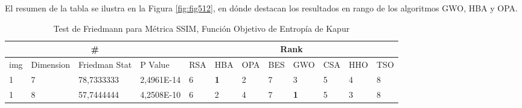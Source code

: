 \documentclass[conference]{IEEEtran}
\begin{document}
\noindent El resumen de la tabla se ilustra en la Figura \ref{fig:fig512}, en dónde destacan los resultados en rango de los algoritmos GWO, HBA y OPA.
\begin{table*}[]
	\centering
	\caption{Test de Friedmann para Métrica SSIM, Función Objetivo de Entropía de Kapur}
	\begin{tabular}{|llll|llllllll|}
		\hline
		\multicolumn{4}{|c|}{\#} & \multicolumn{8}{c|}{Rank} \\ \hline
		\multicolumn{1}{|l|}{img} & \multicolumn{1}{l|}{Dimension} & \multicolumn{1}{l|}{Friedman Stat} & P Value & \multicolumn{1}{l|}{RSA} & \multicolumn{1}{l|}{HBA} & \multicolumn{1}{l|}{OPA} & \multicolumn{1}{l|}{BES} & \multicolumn{1}{l|}{GWO} & \multicolumn{1}{l|}{CSA} & \multicolumn{1}{l|}{HHO} & TSO \\ \hline                                                                                                                                                                       
\multicolumn{1}{|l|}{1}                                                     & \multicolumn{1}{l|}{7}                                                        & \multicolumn{1}{l|}{78,7333333}                                                   & 2,4961E-14                     & \multicolumn{1}{l|}{6}                                                  & \multicolumn{1}{l|}{\textbf{1}}                                         & \multicolumn{1}{l|}{2}                                                  & \multicolumn{1}{l|}{7}                                                  & \multicolumn{1}{l|}{3}                                                  & \multicolumn{1}{l|}{5}                                                  & \multicolumn{1}{l|}{4}                                                  & 8                          \\ \hline
\multicolumn{1}{|l|}{1}                                                     & \multicolumn{1}{l|}{8}                                                        & \multicolumn{1}{l|}{57,7444444}                                                   & 4,2508E-10                     & \multicolumn{1}{l|}{6}                                                  & \multicolumn{1}{l|}{2}                                                  & \multicolumn{1}{l|}{4}                                                  & \multicolumn{1}{l|}{7}                                                  & \multicolumn{1}{l|}{\textbf{1}}                                         & \multicolumn{1}{l|}{5}                                                  & \multicolumn{1}{l|}{3}                                                  & 8                          \\ \hline

\end{tabular}
\end{table*}
\end{document}
